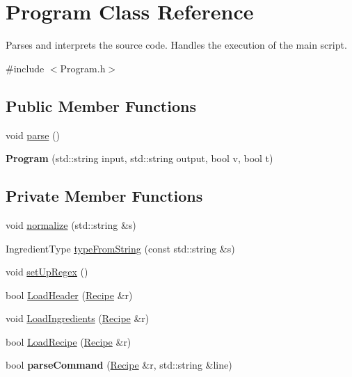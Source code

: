 \hypertarget{classProgram}{\section{Program Class Reference}
\label{classProgram}
}


Parses and interprets the source code. Handles the execution of the main script.  




{\ttfamily \#include $<$Program.\-h$>$}

\subsection*{Public Member Functions}
\begin{DoxyCompactItemize}
\item 
void \hyperlink{classProgram_a7e845a6184bade97aead63d2e14c5040}{parse} ()
\item 
\hypertarget{classProgram_a47ed2a6c6e47ca36658dea2258121198}{{\bfseries Program} (std\-::string input, std\-::string output, bool v, bool t)}\label{classProgram_a47ed2a6c6e47ca36658dea2258121198}

\end{DoxyCompactItemize}
\subsection*{Private Member Functions}
\begin{DoxyCompactItemize}
\item 
void \hyperlink{classProgram_aedd35f415e69743eecf73977a7d24d25}{normalize} (std\-::string \&s)
\item 
Ingredient\-Type \hyperlink{classProgram_a3ec831721e02ca32a698a99342fae446}{type\-From\-String} (const std\-::string \&s)
\item 
void \hyperlink{classProgram_a20fc155df19b3cfc73901e31f2fad53d}{set\-Up\-Regex} ()
\item 
bool \hyperlink{classProgram_a4e8ea37034e515f7c21d3fb3cc119765}{Load\-Header} (\hyperlink{classRecipe}{Recipe} \&r)
\item 
void \hyperlink{classProgram_a277650f0e2ae017e8171aee4fbde0ae2}{Load\-Ingredients} (\hyperlink{classRecipe}{Recipe} \&r)
\item 
bool \hyperlink{classProgram_a28d7594324677db5e10aff47fa97f593}{Load\-Recipe} (\hyperlink{classRecipe}{Recipe} \&r)
\item 
\hypertarget{classProgram_a1a05d46ee937249a32de9d75f5ec7540}{bool {\bfseries parse\-Command} (\hyperlink{classRecipe}{Recipe} \&r, std\-::string \&line)}\label{classProgram_a1a05d46ee937249a32de9d75f5ec7540}

\end{DoxyCompactItemize}
